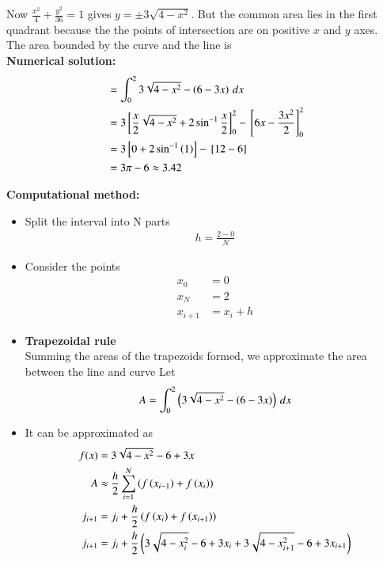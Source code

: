 \documentclass[journal]{IEEEtran}
\numberwithin{equation}{enumi}
\numberwithin{figure}{enumi}
\begin{document}
Now $\frac{x^2}{4}+\frac{y^2}{36} = 1$ gives $y = \pm 3\sqrt{4 - x^2}$. But the common area lies in the first quadrant because the the points of intersection are on positive $x$ and $y$ axes.\\

The area bounded by the curve and the line is \\
\textbf{Numerical solution:}
\begin{align}
    &= \int_0^2{3\sqrt{4 - x^2} - \left(6 - 3x\right)\,dx}\\
    &= 3{}\left[\frac{x}{2}\sqrt{4 - x^2} + 2\sin^{-1}{\frac{x}{2}}\right]_0^2 - {}\left[6x - \frac{3x^2}{2}\right]_0^2\\
    &= 3{}\left[0 + 2\sin^{-1}{\left(1\right)}\right] - {}\left[12 - 6\right]\\
    &= 3\pi - 6 \approx 3.42
\end{align}

\textbf{Computational method:}
\begin{itemize}
    \item Split the interval  into N parts
    \begin{align}
        h = \frac{2 - 0}{N}
    \end{align}
    \item Consider the points 
    \begin{align}
        x_0 &= 0\\
        x_N &= 2\\
        x_{i + 1} &= x_i + h
    \end{align}
    \item \textbf{Trapezoidal rule}\\
    Summing the areas of the trapezoids formed, we approximate the area between the line and curve
    Let 
    \begin{align}
        A = \int_0^2{\left(3\sqrt{4 - x^2} - \left(6 - 3x\right)\right)\,dx}
    \end{align}
    \item It can be approximated as 
    \begin{align}
        f(x) &= 3\sqrt{4 - x^2} - 6 + 3x \\
        A &\approx \frac{h}{2} \sum_{i = 1}^{N}{\left(f\left(x_{i - 1}\right) + f\left(x_i\right)\right)}\\
        j_{i + 1} &= j_i + \frac{h}{2}\left(f\left(x_i\right) + f\left(x_{i + 1}\right)\right)\\
        j_{i + 1} &= j_i + \frac{h}{2}\left(3\sqrt{4 - x_i^2} - 6 + 3x_i + 3\sqrt{4 - x_{i+1}^2} - 6 + 3x_{i + 1}\right)
    \end{align}
\end{itemize}
\end{document}
